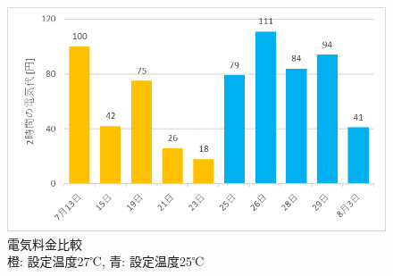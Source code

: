 \documentclass[a4j,fleqn,dvipdfmx,uplatex]{jsarticle}
\begin{document}
\begin{figure}[htb]
  \centering
  \includegraphics[width=\linewidth]{img/fee.png}
  \caption{電気料金比較\\ \small 橙: 設定温度27℃, 青: 設定温度25℃}
  \label{fig:fee}
\end{figure}
\end{document}
